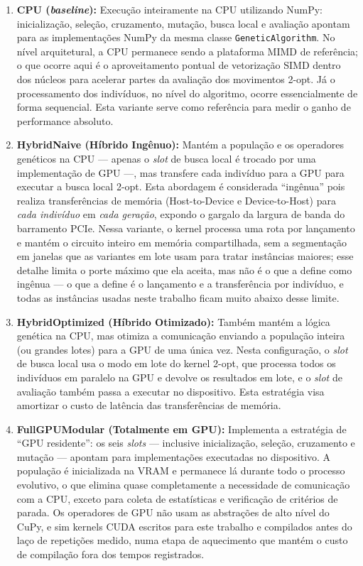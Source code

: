 \begin{enumerate}
  \def\labelenumi{\arabic{enumi}.}
  \item
        \textbf{CPU (\emph{baseline}):} Execução inteiramente na CPU utilizando NumPy: inicialização, seleção, cruzamento, mutação, busca local e avaliação apontam para as implementações NumPy da mesma classe \texttt{GeneticAlgorithm}.
        No nível arquitetural, a CPU permanece sendo a plataforma MIMD de referência; o que ocorre aqui é o aproveitamento pontual de vetorização SIMD dentro dos núcleos para acelerar partes da avaliação dos movimentos 2-opt.
        Já o processamento dos indivíduos, no nível do algoritmo, ocorre essencialmente de forma sequencial.
        Esta variante serve como referência para medir o ganho de performance absoluto.
  \item
        \textbf{HybridNaive (Híbrido Ingênuo):} Mantém a população e os operadores genéticos na CPU --- apenas o \emph{slot} de busca local é trocado por uma implementação de GPU ---, mas transfere cada indivíduo para a GPU para executar a busca local 2-opt.
        Esta abordagem é considerada ``ingênua'' pois realiza transferências de memória (Host-to-Device e Device-to-Host) para \emph{cada indivíduo} em \emph{cada geração}, expondo o gargalo da largura de banda do barramento PCIe.
        Nessa variante, o kernel processa uma rota por lançamento e mantém o circuito inteiro em memória compartilhada, sem a segmentação em janelas que as variantes em lote usam para tratar instâncias maiores; esse detalhe limita o porte máximo que ela aceita, mas não é o que a define como ingênua --- o que a define é o lançamento e a transferência por indivíduo, e todas as instâncias usadas neste trabalho ficam muito abaixo desse limite.
  \item
        \textbf{HybridOptimized (Híbrido Otimizado):} Também mantém a lógica genética na CPU, mas otimiza a comunicação enviando a população inteira (ou grandes lotes) para a GPU de uma única vez.
        Nesta configuração, o \emph{slot} de busca local usa o modo em lote do kernel 2-opt, que processa todos os indivíduos em paralelo na GPU e devolve os resultados em lote, e o \emph{slot} de avaliação também passa a executar no dispositivo.
        Esta estratégia visa amortizar o custo de latência das transferências de memória.
  \item
        \textbf{FullGPUModular (Totalmente em GPU):} Implementa a estratégia de ``GPU residente'': os seis \emph{slots} --- inclusive inicialização, seleção, cruzamento e mutação --- apontam para implementações executadas no dispositivo.
        A população é inicializada na VRAM e permanece lá durante todo o processo evolutivo, o que elimina quase completamente a necessidade de comunicação com a CPU, exceto para coleta de estatísticas e verificação de critérios de parada.
        Os operadores de GPU não usam as abstrações de alto nível do CuPy, e sim kernels CUDA escritos para este trabalho e compilados antes do laço de repetições medido, numa etapa de aquecimento que mantém o custo de compilação fora dos tempos registrados.
\end{enumerate}

